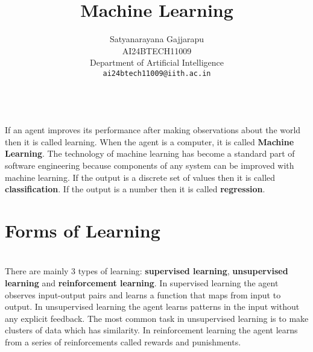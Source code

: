 \documentclass{article}
\title{Machine Learning}
\author{%
Satyanarayana Gajjarapu \\
AI24BTECH11009 \\
Department of Artificial Intelligence \\
\texttt{ai24btech11009@iith.ac.in} \\
}
\begin{document}
\maketitle

\begin{paragraph}
\\
If an agent improves its performance after making observations about the world then it is called learning. When the agent is a computer, it is called \textbf{Machine Learning}. The technology of machine learning has become a standard part of software engineering because components of any system can be improved with machine learning. If the output is a discrete set of values then it is called \textbf{classification}. If the output is a number then it is called \textbf{regression}.
\end{paragraph}
\section{Forms of Learning}
\begin{paragraph}
\\
There are mainly 3 types of learning: \textbf{supervised learning}, \textbf{unsupervised learning} and \textbf{reinforcement learning}. In supervised learning the agent observes input-output pairs and learns a function that maps from input to output. In unsupervised learning the agent learns patterns in the input without any explicit feedback. The most common task in unsupervised learning is to make clusters of data which has similarity. In reinforcement learning the agent learns from a series of reinforcements called rewards and punishments. 
\end{paragraph}
\end{document}
